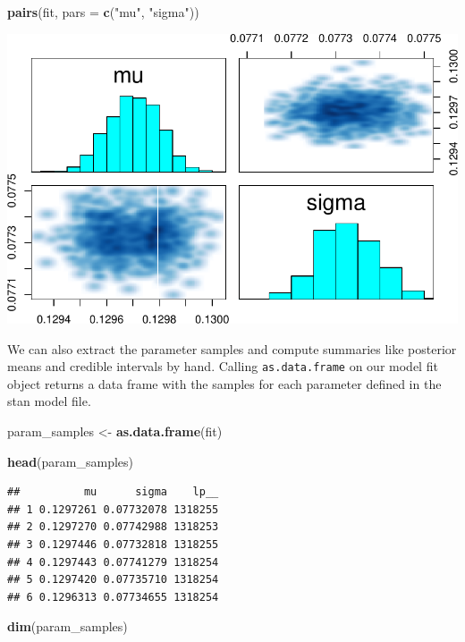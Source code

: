 \documentclass[]{article}
\newenvironment{Shaded}{\begin{snugshade}}{\end{snugshade}}
\newcommand{\KeywordTok}[1]{\textcolor[rgb]{0.13,0.29,0.53}{\textbf{#1}}}
\newcommand{\DataTypeTok}[1]{\textcolor[rgb]{0.13,0.29,0.53}{#1}}
\newcommand{\StringTok}[1]{\textcolor[rgb]{0.31,0.60,0.02}{#1}}
\newcommand{\NormalTok}[1]{#1}
\begin{document}
\begin{Shaded}
\begin{Highlighting}[]
\KeywordTok{pairs}\NormalTok{(fit, }\DataTypeTok{pars =} \KeywordTok{c}\NormalTok{(}\StringTok{"mu"}\NormalTok{, }\StringTok{"sigma"}\NormalTok{))}
\end{Highlighting}
\end{Shaded}

\includegraphics{20190225_bayes_MCMC_Metropolis_files/figure-latex/unnamed-chunk-15-2.pdf}

We can also extract the parameter samples and compute summaries like
posterior means and credible intervals by hand. Calling
\texttt{as.data.frame} on our model fit object returns a data frame with
the samples for each parameter defined in the stan model file.

\begin{Shaded}
\begin{Highlighting}[]
\NormalTok{param_samples <-}\StringTok{ }\KeywordTok{as.data.frame}\NormalTok{(fit)}

\KeywordTok{head}\NormalTok{(param_samples)}
\end{Highlighting}
\end{Shaded}

\begin{verbatim}
##          mu      sigma    lp__
## 1 0.1297261 0.07732078 1318255
## 2 0.1297270 0.07742988 1318253
## 3 0.1297446 0.07732818 1318255
## 4 0.1297443 0.07741279 1318254
## 5 0.1297420 0.07735710 1318254
## 6 0.1296313 0.07734655 1318254
\end{verbatim}

\begin{Shaded}
\begin{Highlighting}[]
\KeywordTok{dim}\NormalTok{(param_samples)}
\end{Highlighting}
\end{Shaded}
\end{document}

